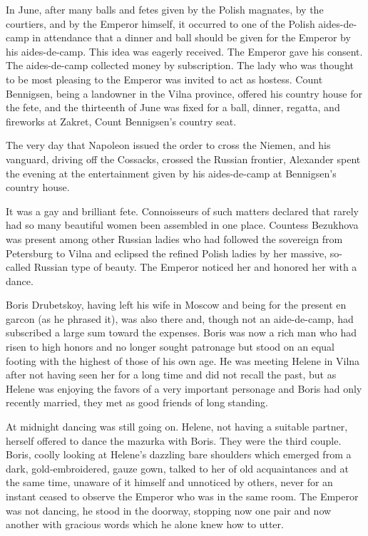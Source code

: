 In June, after many balls and fetes given by the Polish magnates,
by the courtiers, and by the Emperor himself, it occurred to one
of the Polish aides-de-camp in attendance that a dinner and ball
should be given for the Emperor by his aides-de-camp. This idea
was eagerly received. The Emperor gave his consent. The
aides-de-camp collected money by subscription. The lady who was
thought to be most pleasing to the Emperor was invited to act as
hostess. Count Bennigsen, being a landowner in the Vilna
province, offered his country house for the fete, and the
thirteenth of June was fixed for a ball, dinner, regatta, and
fireworks at Zakret, Count Bennigsen's country seat.

The very day that Napoleon issued the order to cross the Niemen,
and his vanguard, driving off the Cossacks, crossed the Russian
frontier, Alexander spent the evening at the entertainment given
by his aides-de-camp at Bennigsen's country house.

It was a gay and brilliant fete. Connoisseurs of such matters
declared that rarely had so many beautiful women been assembled
in one place.  Countess Bezukhova was present among other Russian
ladies who had followed the sovereign from Petersburg to Vilna
and eclipsed the refined Polish ladies by her massive, so-called
Russian type of beauty. The Emperor noticed her and honored her
with a dance.

Boris Drubetskoy, having left his wife in Moscow and being for
the present en garcon (as he phrased it), was also there and,
though not an aide-de-camp, had subscribed a large sum toward the
expenses. Boris was now a rich man who had risen to high honors
and no longer sought patronage but stood on an equal footing with
the highest of those of his own age. He was meeting Helene in
Vilna after not having seen her for a long time and did not
recall the past, but as Helene was enjoying the favors of a very
important personage and Boris had only recently married, they met
as good friends of long standing.

At midnight dancing was still going on. Helene, not having a
suitable partner, herself offered to dance the mazurka with
Boris. They were the third couple. Boris, coolly looking at
Helene's dazzling bare shoulders which emerged from a dark,
gold-embroidered, gauze gown, talked to her of old acquaintances
and at the same time, unaware of it himself and unnoticed by
others, never for an instant ceased to observe the Emperor who
was in the same room. The Emperor was not dancing, he stood in
the doorway, stopping now one pair and now another with gracious
words which he alone knew how to utter.

